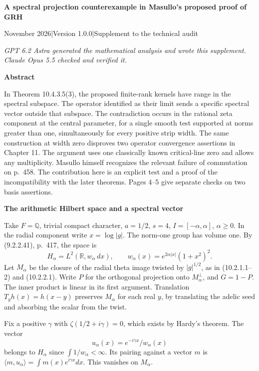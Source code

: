 \documentclass[11pt]{article}
\newcommand{\R}{\mathbb R}\newcommand{\Q}{\mathbb Q}\newcommand{\C}{\mathbb C}
\newcommand{\topic}[1]{\par\medskip\textbf{#1}\par}
\begin{document}
{\LARGE\bfseries\color{ink}A spectral projection counterexample in Masullo's proposed proof of GRH}\par
{\small{} November 2026\quad|\quad Version 1.0.0\quad|\quad Supplement to the technical audit\par}
{\small\itshape GPT 6.2 Astra generated the mathematical analysis and wrote this supplement. Claude Opus 5.5 checked and verified it.\par}
\topic{Abstract}
In Theorem 10.4.3.5(3), the proposed finite-rank kernels have range in the spectral subspace. The operator identified as their limit sends a specific spectral vector outside that subspace. The contradiction occurs in the rational zeta component at the central parameter, for a single smooth test supported at norms greater than one, simultaneously for every positive strip width. The same construction at width zero disproves two operator convergence assertions in Chapter 11. The argument uses one classically known critical-line zero and allows any multiplicity. Masullo himself recognizes the relevant failure of commutation on p.~458. The contribution here is an explicit test and a proof of the incompatibility with the later theorems. Pages 4--5 give separate checks on two basis assertions.
\topic{The arithmetic Hilbert space and a spectral vector}
Take \(F=\Q\), trivial compact character, \(a=1/2\), \(s=4\), \(I=[-\alpha,\alpha]\), \(\alpha\ge0\). In the radial component write \(x=\log|g|\). The norm-one group has volume one. By (9.2.2.41), p.~417, the space is
\[
 H_\alpha=L^2(\R,w_\alpha\,dx),\qquad w_\alpha(x)=e^{2\alpha|x|}(1+x^2)^2.
\]
Let \(M_\alpha\) be the closure of the radial theta image twisted by \(|g|^{1/2}\), as in (10.2.1.1--2) and (10.2.2.1). Write \(P\) for the orthogonal projection onto \(M_\alpha^\perp\), and \(G=1-P\). The inner product is linear in its first argument. Translation \(T_y h(x)=h(x-y)\) preserves \(M_\alpha\) for each real \(y\), by translating the adelic seed and absorbing the scalar from the twist.
 
Fix a positive \(\gamma\) with \(\zeta(1/2+i\gamma)=0\), which exists by Hardy's theorem. The vector
\[
                 u_\alpha(x)=e^{-i\gamma x}/w_\alpha(x)
\]
belongs to \(H_\alpha\) since \(\int 1/w_\alpha<\infty\). Its pairing against a vector \(m\) is \(\langle m,u_\alpha\rangle=\int m(x)e^{i\gamma x}dx\). This vanishes on \(M_\alpha\).
\end{document}

